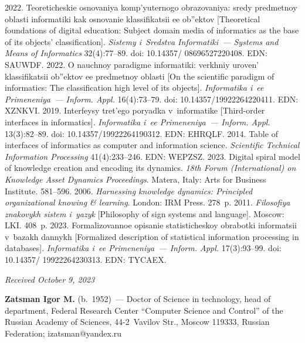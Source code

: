 \begin{multicols}{2}
{{\begin{thebibliography}{99}
 2022. Teoreticheskie osnovaniya komp'yuternogo obrazovaniya: sredy predmetnoy 
oblasti informatiki kak osnovanie klassifikatsii ee ob''ektov [Theoretical foundations of digital education: 
Subject domain media of informatics as the base of its objects' classification]. \textit{Sistemy i~Sredstva 
Informatiki~--- Systems and Means of Informatics} 32(4):77--89. doi: 10.14357/ 08696527220408. EDN: 
SAUWDF.
 2022. O nauchnoy paradigme informatiki: verkhniy uroven' klassifikatsii ob''ektov 
ee predmetnoy oblasti [On the scientific paradigm of informatics: The classification high level of its 
objects].  \textit{Informatika i~ee Primeneniya~--- Inform. Appl.} 16(4):73--79. doi: 
10.14357/19922264220411. EDN: XZNKVI.
 2019. Interfeysy tret'ego poryadka v~informatike [Third-order interfaces in 
informatics].  \textit{Informatika i~ee Primeneniya~--- Inform. Appl.} 13(3):82--89. doi: 
10.14357/19922264190312. EDN: EHRQLF.
 2014. Table of interfaces of informatics as computer and information science. 
\textit{Scientific Technical Information Processing} 41(4):233--246. EDN: \mbox{WEPZSZ}.
 2023. Digital spiral model of knowledge creation and encoding its dynamics. \textit{18th 
Forum (International) on Knowledge Asset Dynamics Proceedings}. Matera, Italy: Arts for Business 
Institute.  581--596.
 2006. \textit{Harnessing knowledge dynamics: Principled organizational knowing \& 
learning}. London: IRM Press. 278~p.
 2011. \textit{Filosofiya znakovykh sistem i~yazyk} [Philosophy of sign systems 
and language]. Moscow: LKI. 408~p.
 2023. For\-ma\-li\-zo\-van\-noe opi\-sa\-nie statisticheskoy obrabotki 
in\-for\-ma\-tsii v~bazakh dannykh [Formalized description of statistical information processing in databases]. 
\textit{Informatika i~ee Primeneniya~--- Inform. Appl.} 17(3):93--99. doi: 10.14357/ 19922264230313. 
EDN: TYCAEX.

\end{thebibliography}

 }
 }

\end{multicols}

\vspace*{-8pt}

\hfill{\small\textit{Received October 9, 2023}} 

\vspace*{-18pt}

\Contrl

\vspace*{-4pt}

\noindent
\textbf{Zatsman Igor M.} (b.\ 1952)~--- Doctor of Science in technology, head of department, Federal 
Research Center ``Computer Science and Control'' of the Russian Academy of Sciences, 44-2~Vavilov Str., 
Moscow 119333, Russian Federation; \mbox{izatsman@yandex.ru}


\label{end\stat}

\renewcommand{\bibname}{\protect\rm Литература} 